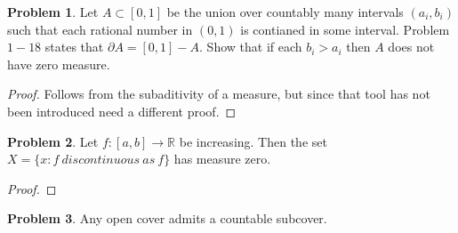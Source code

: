 \documentclass[20pt]{article}
\theoremstyle{plain}
\theoremstyle{definition}
\newtheorem*{problem}{Problem}
\newcommand{\reals}{\mathbb{R}}
\begin{document}
\begin{problem}{3.11}
  Let $A \subset [0, 1]$ be the union over countably many intervals $(a_i, b_i)$
  such that each rational number in $(0, 1)$ is contianed in  some interval.
  Problem $1-18$ states that $\partial A = [0, 1] - A$.
  Show that if each $b_i > a_i$ then $A$ does not have zero measure.
\end{problem}
\begin{proof}
  \color{ForestGreen} Follows from the subaditivity of a measure, but since that tool has not been introduced need a different proof.
\end{proof}


\begin{problem}{3.12}
  Let $f: [a, b] \to \reals$ be increasing. Then the set 
  $X = \{ x: f\ discontinuous\ as\ f \}$ has measure zero.
\end{problem}

\begin{proof}
  \color{ForestGreen}
\end{proof}


\begin{problem}{3.13}
  Any open cover admits a countable subcover.
\end{problem}
\end{document}
